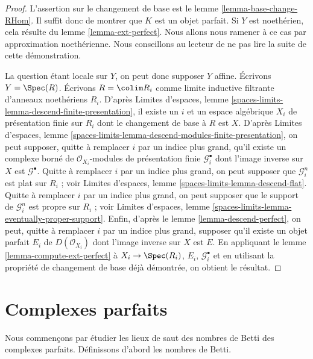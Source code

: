 \begin{proof}
L'assertion sur le changement de base est le lemme \ref{lemma-base-change-RHom}.
Il suffit donc de montrer que $K$ est un objet parfait. Si $Y$ est
noeth\'erien, cela r\'esulte du lemme \ref{lemma-ext-perfect}.
Nous allons nous ramener \`a ce cas par approximation noeth\'erienne.
Nous conseillons au lecteur de ne pas lire la suite de cette d\'emonstration.

\medskip\noindent
La question \'etant locale sur $Y$, on peut donc supposer $Y$ affine.
Écrivons $Y = \Spec(R)$. Écrivons $R = \colim R_i$ comme limite inductive
filtrante d'anneaux noeth\'eriens $R_i$. D'apr\`es Limites d'espaces, lemme
\ref{spaces-limits-lemma-descend-finite-presentation},
il existe un $i$ et un espace alg\'ebrique $X_i$ de pr\'esentation finie
sur $R_i$ dont le changement de base \`a $R$ est $X$. D'apr\`es
Limites d'espaces, lemme
\ref{spaces-limits-lemma-descend-modules-finite-presentation},
on peut supposer, quitte \`a remplacer $i$ par un indice plus grand,
qu'il existe un complexe born\'e de $\mathcal{O}_{X_i}$-modules de pr\'esentation
finie $\mathcal{G}_i^\bullet$ dont
l'image inverse sur $X$ est $\mathcal{G}^\bullet$. Quitte \`a remplacer $i$
par un indice plus grand,
on peut supposer que $\mathcal{G}_i^n$ est plat sur $R_i$ ; voir
Limites d'espaces, lemme
\ref{spaces-limits-lemma-descend-flat}.
Quitte \`a remplacer $i$ par un indice plus grand, on peut supposer que
le support de $\mathcal{G}_i^n$ est propre sur $R_i$ ; voir
Limites d'espaces, lemme \ref{spaces-limits-lemma-eventually-proper-support}.
Enfin, d'apr\`es le lemme \ref{lemma-descend-perfect},
on peut, quitte \`a remplacer $i$ par un indice plus grand, supposer qu'il
existe un objet parfait $E_i$ de $D(\mathcal{O}_{X_i})$ dont l'image inverse
sur $X$ est $E$. En appliquant le lemme \ref{lemma-compute-ext-perfect}
\`a $X_i \to \Spec(R_i)$, $E_i$, $\mathcal{G}_i^\bullet$ et en utilisant la
propri\'et\'e de changement de base d\'ej\`a d\'emontr\'ee, on obtient le r\'esultat.
\end{proof}







\section{Complexes parfaits}
\label{section-perfect-complexes}

\noindent
Nous commençons par étudier les lieux de saut des nombres de Betti des complexes
parfaits. Définissons d'abord les nombres de Betti.

